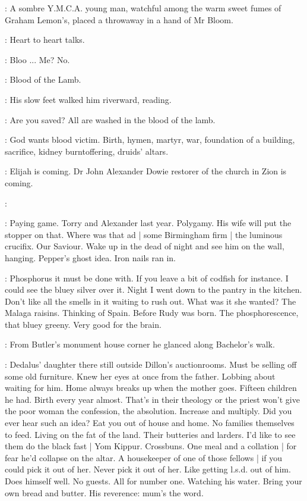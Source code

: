 :
A sombre Y.M.C.A. young man,
watchful among the warm sweet fumes of Graham Lemon's,
placed a throwaway in a hand of Mr Bloom.

:
Heart to heart talks.

\BloomInt:
Bloo ...
Me?
No.

\BloomInt:
Blood of the Lamb.


:
His slow feet walked him riverward, reading.

:
Are you saved?
All are washed in the blood of the lamb.

\BloomInt:
God wants blood victim.
Birth, hymen, martyr, war,
foundation of a building,
sacrifice,
kidney burntoffering,
druids' altars.

:
Elijah is coming.
Dr John Alexander Dowie restorer of the church in Zion is coming.

:

\BloomInt:
Paying game.
Torry and Alexander last year.
Polygamy.
His wife will put the stopper on that.
Where was that ad |
some Birmingham firm |
the luminous crucifix.
Our Saviour.
Wake up in the dead of night and see him on the wall, hanging.
Pepper's ghost idea.
Iron nails ran in.

\BloomInt:
Phosphorus it must be done with.
If you leave a bit of codfish for instance.
I could see the bluey silver over it.
Night I went down to the pantry in the kitchen.
Don't like all the smells in it waiting to rush out.
What was it she wanted?
The Malaga raisins.
Thinking of Spain.
Before Rudy was born.
The phosphorescence, that bluey greeny.
Very good for the brain.

:
From Butler's monument house corner
he glanced along Bachelor's walk.

\BloomInt:
Dedalus' daughter there still
outside Dillon's auctionrooms.
Must be selling off some old furniture.
Knew her eyes at once from the father.
Lobbing about waiting for him.
Home always breaks up when the mother goes.
Fifteen children he had.
Birth every year almost.
That's in their theology
or the priest won't give the poor woman
the confession,
the absolution.
Increase and multiply.
Did you ever hear such an idea?
Eat you out of house and home.
No families themselves to feed.
Living on the fat of the land.
Their butteries and larders.
I'd like to see them do the black fast |
Yom Kippur.
Crossbuns.
One meal and a collation |
for fear he'd collapse on the altar.
A housekeeper of one of those fellows |
if you could pick it out of her.
Never pick it out of her.
Like getting l.s.d. out of him.
Does himself well.
No guests.
All for number one.
Watching his water.
Bring your own bread and butter.
His reverence:
mum's the word.

